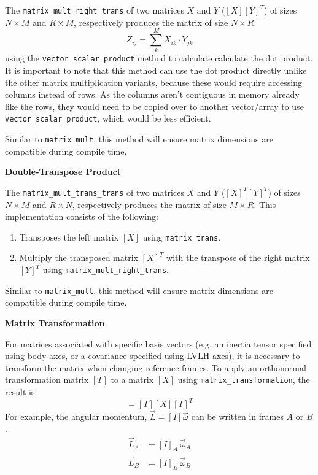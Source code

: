 \documentclass[11pt,fleqn]{report}
\begin{document}
The \texttt{matrix\_mult\_right\_trans} of two matrices $X$ and $Y$ ($[X][Y]^T$) 
of sizes $N \times M$ and
$R \times M$, respectively produces the matrix of size $N \times R$:
\begin{equation*}
Z_{ij} = \sum_k^M X_{ik} \cdot Y_{jk}
\end{equation*}
using the \texttt{vector\_scalar\_product} method to calculate calculate the dot 
product. It is important to note that this method can use the dot product directly
unlike the other matrix multiplication variants, because these would require 
accessing columns instead of rows. As the columns aren't contiguous in memory already
like the rows, they would need to be copied over to another vector/array to use 
\texttt{vector\_scalar\_product}, which would be less efficient.

Similar to \texttt{matrix\_mult}, this method will ensure matrix dimensions are
compatible during compile time.

\textbf{Double-Transpose Product}

The \texttt{matrix\_mult\_trans\_trans} of two matrices $X$ and $Y$ ($[X]^T[Y]^T$) 
of sizes $N \times M$ and
$R \times N$, respectively produces the matrix of size $M \times R$. 
This implementation consists of the following:
\begin{enumerate}
\item Transposes the left matrix $[X]$ using \texttt{matrix\_trans}.
\item Multiply the transposed matrix $[X]^T$ with the transpose 
of the right matrix $[Y]^T$ using 
\texttt{matrix\_mult\_right\_trans}.
\end{enumerate}
Similar to \texttt{matrix\_mult}, this method will ensure matrix dimensions are
compatible during compile time.

\textbf{Matrix Transformation}

For matrices associated with specific basis vectors (e.g. an inertia tensor
specified using body-axes, or a covariance specified using LVLH axes), it is
necessary to transform the matrix when changing reference frames. 
To apply an orthonormal transformation matrix $[T]$ to a matrix $[X]$
using \texttt{matrix\_transformation}, the result is:
\begin{equation}
[Y] = [T][X][T]^T
\label{eqn:matrix_transform}
\end{equation}
For example, the angular momentum, $\vec L = [I] \vec \omega$ can be written
in frames $A$ or $B$.
\begin{align*}
\vec L_A &= [I]_A ~\vec \omega_A \\
\vec L_B &= [I]_B ~\vec \omega_B
\end{align*}
\end{document}
